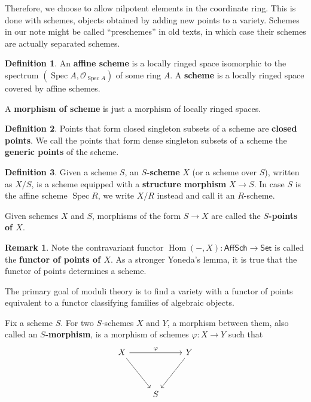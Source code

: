\documentclass[12pt]{article}
\theoremstyle{remark}
\theoremstyle{definition}
\newtheorem{remark}{Remark}[section]
\newtheorem{definition}{Definition}[section]
\newcommand{\Spec}[0]{\operatorname{Spec}}
\newcommand{\Hom}[0]{\operatorname{Hom}}
\newcommand{\Aff}[0]{\mathsf{Aff}}
\newcommand{\Sch}[0]{\mathsf{Sch}}
\newcommand{\Set}[0]{\mathsf{Set}}
\begin{document}
    Therefore, we choose to allow nilpotent elements in the coordinate ring. This is done with schemes, objects obtained by adding new points to a variety. Schemes in our note might be called ``preschemes'' in old texts, in which case their schemes are actually separated schemes.
    \begin{definition}
        An \textbf{affine scheme} is a locally ringed space isomorphic to the spectrum $(\Spec A, \mathcal O_{\Spec A})$ of some ring $A$. A \textbf{scheme} is a locally ringed space covered by affine schemes.

        A \textbf{morphism of scheme} is just a morphism of locally ringed spaces.
    \end{definition}
    \begin{definition}
        Points that form closed singleton subsets of a scheme are \textbf{closed points}. We call the points that form dense singleton subsets of a scheme the \textbf{generic points} of the scheme.
    \end{definition}
    \begin{definition}
        Given a scheme $S$, an \textbf{$S$-scheme} $X$ (or a scheme over $S$), written as $X/S$, is a scheme equipped with a \textbf{structure morphism} $X\to S$. In case $S$ is the affine scheme $\Spec R$, we write $X/R$ instead and call it an $R$-scheme.

        Given schemes $X$ and $S$, morphisms of the form $S\to X$ are called the \textbf{$S$-points of $X$}.
    \end{definition}
    \begin{remark}
        Note the contravariant functor $\Hom(-,X):\Aff\Sch\to \Set$ is called the \textbf{functor of points of $X$}. As a stronger Yoneda's lemma, it is true that the functor of points determines a scheme.

        The primary goal of moduli theory is to find a variety with a functor of points equivalent to a functor classifying families of algebraic objects.
    \end{remark}
    Fix a scheme $S$. For two $S$-schemes $X$ and $Y$, a morphism between them, also called an \textbf{$S$-morphism}, is a morphism of schemes $\varphi:X\to Y$ such that
    \[\begin{tikzcd}
        X \arrow[rdd] \arrow[rr, "\varphi"] &   & Y \arrow[ldd] \\
                                            &   &               \\
                                            & S &              
        \end{tikzcd}\]
\end{document}
